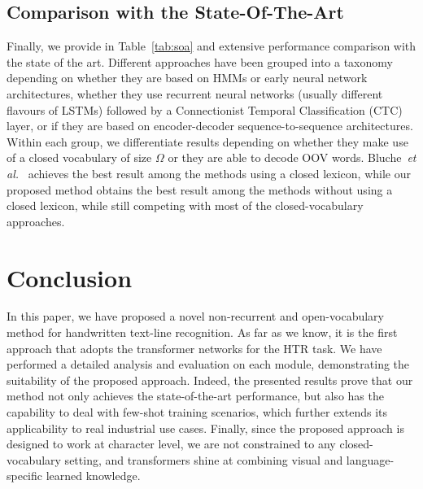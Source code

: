 \documentclass[10pt,twocolumn,letterpaper]{article}
\begin{document}
\subsection{Comparison with the State-Of-The-Art}
Finally, we provide in Table~\ref{tab:soa} and extensive performance comparison with the state of the art. Different approaches have been grouped into a taxonomy depending on whether they are based on HMMs or early neural network architectures, whether they use recurrent neural networks (usually different flavours of LSTMs) followed by a Connectionist Temporal Classification (CTC) layer, or if they are based on encoder-decoder sequence-to-sequence architectures. Within each group, we differentiate results depending on whether they make use of a closed vocabulary of size $\Omega$ or they are able to decode OOV words. Bluche~\emph{et al.}~\cite{bluche2017gated} achieves the best result among the methods using a closed lexicon, while our proposed method obtains the best result among the methods without using a closed lexicon, while still competing with most of the closed-vocabulary approaches.  


\section{Conclusion}
In this paper, we have proposed a novel non-recurrent and open-vocabulary method for handwritten text-line recognition. As far as we know, it is the first approach that adopts the transformer networks for the HTR task. We have performed a detailed analysis and evaluation on each module, demonstrating the suitability of the proposed approach. Indeed, the presented results prove that our method not only achieves the state-of-the-art performance, but also has the capability to deal with few-shot training scenarios, which further extends its applicability to real industrial use cases. Finally, since the proposed approach is designed to work at character level, we are not constrained to any closed-vocabulary setting, and transformers shine at combining visual and language-specific learned knowledge.



{\small


}
\end{document}
